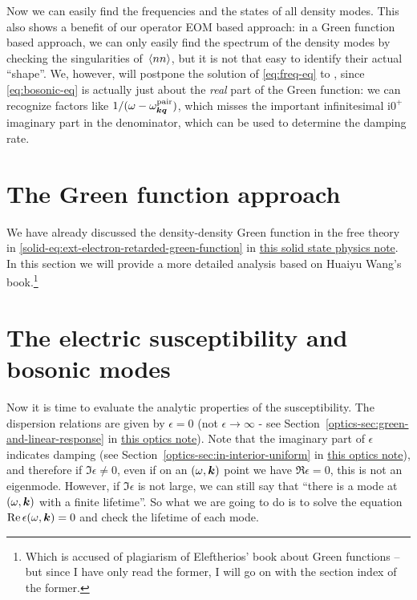 \documentclass[hyperref, a4paper]{article}
\newcommand*{\ii}{\mathrm{i}}
\newcommand{\soliddoc}{\href{../solid/solid.pdf}{this solid state physics note}}
\newcommand{\opticsdoc}{\href{../optics/optics.pdf}{this optics note}}
\begin{document}
Now we can easily find the frequencies and the states of all density modes. This also shows a benefit 
of our operator EOM based approach: in a Green function based approach, we can only easily find the 
spectrum of the density modes by checking the singularities of $\expval*{nn}$, but it is not that 
easy to identify their actual ``shape''. We, however, will postpone the solution of \eqref{eq:freq-eq} \marginnote{}
to , since \eqref{eq:bosonic-eq} is actually just about the \emph{real} part of 
the Green function: we can recognize factors like $1 / (\omega - \omega^\text{pair}_{\vb*{k} \vb*{q}})$,
which misses the important infinitesimal $\ii 0^+$ imaginary part in the denominator, which can be used to 
determine the damping rate.  

\section{The Green function approach}\label{sec:green}

We have already discussed the density-density Green function in the free theory in \eqref{solid-eq:ext-electron-retarded-green-function} in \soliddoc. In this section we will provide a more 
detailed analysis based on Huaiyu Wang's book.\footnote{Which is accused of plagiarism of Eleftherios' book about Green functions -- but since I have only read the former, I will go on with the section index of the former.} 


\section{The electric susceptibility and bosonic modes}\label{sec:boson-modes}

Now it is time to evaluate the analytic properties of the susceptibility. 
The dispersion relations are given by $\epsilon = 0$ (not $\epsilon \to \infty$ - see 
Section~\ref{optics-sec:green-and-linear-response} in \opticsdoc). 
Note that the imaginary part of $\epsilon$ indicates damping (see Section~\ref{optics-sec:in-interior-uniform}
in \opticsdoc), and therefore if $\Im \epsilon \neq 0$, even if on an $(\omega, \vb*{k})$ point we have 
$\Re \epsilon = 0$, this is not an eigenmode. However, if $\Im \epsilon$ is not large, we can still say 
that ``there is a mode at $(\omega, \vb*{k})$ with a finite lifetime''. So what we are going to do is 
to solve the equation $\Re \epsilon(\omega, \vb*{k}) = 0$ and check the lifetime of each mode.
\end{document}
